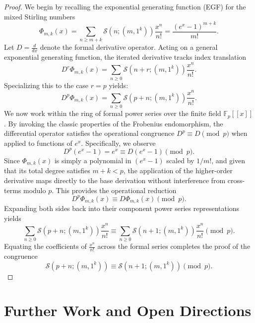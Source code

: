 \documentclass[12pt]{amsart}
\theoremstyle{definition}
\begin{document}
\begin{proof}
We begin by recalling the exponential generating function (EGF) for the mixed Stirling numbers
\begin{equation}
\label{eq:egf_mixed_stirling}
\Phi_{m,k}(x) = \sum_{n \ge m+k} \mathcal{S}(n;(m,1^k)) \frac{x^n}{n!} = \frac{(e^x-1)^{m+k}}{m!}.
\end{equation}
Let $D = \frac{d}{dx}$ denote the formal derivative operator. Acting on a general exponential generating function, the iterated derivative tracks index translation
\begin{equation*}
D^r \Phi_{m,k}(x) = \sum_{n \ge 0} \mathcal{S}(n+r;(m,1^k)) \frac{x^n}{n!}.
\end{equation*}
Specializing this to the case $r = p$ yields:
\begin{equation*}
D^p \Phi_{m,k}(x) = \sum_{n \ge 0} \mathcal{S}(p+n;(m,1^k)) \frac{x^n}{n!}.
\end{equation*}
We now work within the ring of formal power series over the finite field $\mathbb{F}_p[[x]]$. By invoking the classic properties of the Frobenius endomorphism, the differential operator satisfies the operational congruence $D^p \equiv D \pmod p$ when applied to functions of $e^x$. Specifically, we observe
\begin{equation*}
D^p(e^x-1) = e^x \equiv D(e^x-1) \pmod p.
\end{equation*}
Since $\Phi_{m,k}(x)$ is simply a polynomial in $(e^x-1)$ scaled by $1/m!$, and given that its total degree satisfies $m+k < p$, the application of the higher-order derivative maps directly to the base derivation without interference from cross-terms modulo $p$. This provides the operational reduction
\begin{equation*}
D^p \Phi_{m,k}(x) \equiv D \Phi_{m,k}(x) \pmod p.
\end{equation*}
Expanding both sides back into their component power series representations yields
\begin{equation*}
\sum_{n \ge 0} \mathcal{S}(p+n;(m,1^k)) \frac{x^n}{n!} \equiv \sum_{n \ge 0} \mathcal{S}(n+1;(m,1^k)) \frac{x^n}{n!} \pmod p.
\end{equation*}
Equating the coefficients of $\frac{x^n}{n!}$ across the formal series completes the proof of the congruence
\begin{equation*}
\mathcal{S}(p+n;(m,1^k)) \equiv \mathcal{S}(n+1;(m,1^k)) \pmod p.
\end{equation*}
\end{proof}
\section{Further Work and Open Directions}
\end{document}
